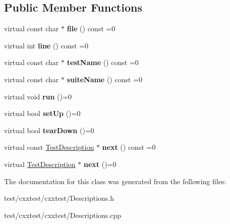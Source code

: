 \subsection*{Public Member Functions}
\begin{DoxyCompactItemize}
\item 
\hypertarget{classCxxTest_1_1TestDescription_a8dc3f35df17d97fef2b1aac53f00f3d5}{virtual const char $\ast$ {\bfseries file} () const =0}\label{classCxxTest_1_1TestDescription_a8dc3f35df17d97fef2b1aac53f00f3d5}

\item 
\hypertarget{classCxxTest_1_1TestDescription_a68b38b5ff36dfba54b1d565f27c35e71}{virtual int {\bfseries line} () const =0}\label{classCxxTest_1_1TestDescription_a68b38b5ff36dfba54b1d565f27c35e71}

\item 
\hypertarget{classCxxTest_1_1TestDescription_a7b4511ccaa25be6068e74e13056fef8f}{virtual const char $\ast$ {\bfseries test\-Name} () const =0}\label{classCxxTest_1_1TestDescription_a7b4511ccaa25be6068e74e13056fef8f}

\item 
\hypertarget{classCxxTest_1_1TestDescription_afd71136f44a77458ecd9c64e1532d705}{virtual const char $\ast$ {\bfseries suite\-Name} () const =0}\label{classCxxTest_1_1TestDescription_afd71136f44a77458ecd9c64e1532d705}

\item 
\hypertarget{classCxxTest_1_1TestDescription_a2ce7ad24ec903a9e7f8ab1e1c3930ac9}{virtual void {\bfseries run} ()=0}\label{classCxxTest_1_1TestDescription_a2ce7ad24ec903a9e7f8ab1e1c3930ac9}

\item 
\hypertarget{classCxxTest_1_1TestDescription_af6a0554899dd7293f73ab5eb42de79e7}{virtual bool {\bfseries set\-Up} ()=0}\label{classCxxTest_1_1TestDescription_af6a0554899dd7293f73ab5eb42de79e7}

\item 
\hypertarget{classCxxTest_1_1TestDescription_aff0b982070c2fc8db0ce7651b0841595}{virtual bool {\bfseries tear\-Down} ()=0}\label{classCxxTest_1_1TestDescription_aff0b982070c2fc8db0ce7651b0841595}

\item 
\hypertarget{classCxxTest_1_1TestDescription_abe347cf8b0f59c74b2415a37a8ae20c5}{virtual const \hyperlink{classCxxTest_1_1TestDescription}{Test\-Description} $\ast$ {\bfseries next} () const =0}\label{classCxxTest_1_1TestDescription_abe347cf8b0f59c74b2415a37a8ae20c5}

\item 
\hypertarget{classCxxTest_1_1TestDescription_ac8bbb212dd45322d75b529e7fc56aeec}{virtual \hyperlink{classCxxTest_1_1TestDescription}{Test\-Description} $\ast$ {\bfseries next} ()=0}\label{classCxxTest_1_1TestDescription_ac8bbb212dd45322d75b529e7fc56aeec}

\end{DoxyCompactItemize}


The documentation for this class was generated from the following files\-:\begin{DoxyCompactItemize}
\item 
test/cxxtest/cxxtest/Descriptions.\-h\item 
test/cxxtest/cxxtest/Descriptions.\-cpp\end{DoxyCompactItemize}
